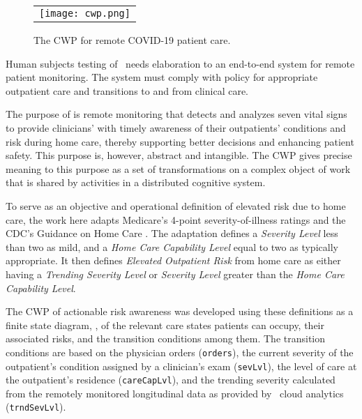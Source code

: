 \begin{figure*}[t]
  \begin{center}
    \begin{tabular}{c}
      \texttt{[image: cwp.png]}
    \end{tabular}
  \end{center}
\caption{The CWP for remote COVID-19 patient care.}
\label{fig:cwp}
\end{figure*}

Human subjects testing of \phware\ needs elaboration to an end-to-end system for remote patient monitoring. The system must comply with policy for appropriate outpatient care and transitions to and from clinical care.

The purpose of \phware is remote monitoring that detects and analyzes seven vital signs to provide clinicians' with timely awareness of their outpatients' conditions and risk during home care, thereby supporting better decisions and enhancing patient safety. This purpose is, however, abstract and intangible. The CWP gives precise meaning to this purpose as a set of transformations on a complex object of work that is shared by activities in a distributed cognitive system.

To serve as an objective and operational definition of elevated risk due to home care, the work here adapts Medicare's 4-point severity-of-illness ratings \cite{Hornbrook2005OverviewOD,severity} and the CDC's Guidance on Home Care \cite{cdc}. The adaptation defines a \emph{Severity Level} less than two as mild, and a \emph{Home Care Capability Level} equal to two as typically appropriate. It then defines \emph{Elevated Outpatient Risk} from home care as either having a \emph{Trending Severity Level} or \emph{Severity Level} greater than the \emph{Home Care Capability Level}.

The CWP of actionable risk awareness was developed using these definitions as a finite state diagram, , of the relevant care states patients can occupy, their associated risks, and the transition conditions among them. The transition conditions are based on the physician orders (\texttt{orders}), the current severity of the outpatient's condition assigned by a clinician's exam (\texttt{sevLvl}), the level of care at the outpatient's residence (\texttt{careCapLvl}), and the trending severity calculated from the remotely monitored longitudinal data as provided by
\phware\ cloud analytics (\texttt{trndSevLvl}). 


